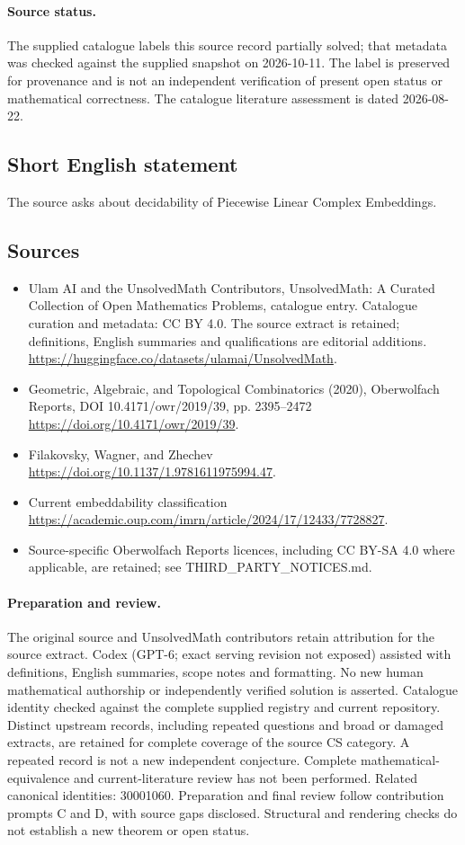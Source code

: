 \documentclass[11pt]{article}
\begin{document}
\paragraph{Source status.}
The supplied catalogue labels this source record partially solved; that metadata was checked against the supplied snapshot on 2026-10-11. The label is preserved for provenance and is not an independent verification of present open status or mathematical correctness. The catalogue literature assessment is dated 2026-08-22.
\subsection{Short English statement}
The source asks about decidability of Piecewise Linear Complex Embeddings.
\subsection{Sources}
\begin{itemize}
\item[\hypertarget{source:statement:1}{S1}] Ulam AI and the UnsolvedMath Contributors, UnsolvedMath: A Curated Collection of Open Mathematics Problems, catalogue entry. Catalogue curation and metadata: CC BY 4.0. The source extract is retained; definitions, English summaries and qualifications are editorial additions.
\url{https://huggingface.co/datasets/ulamai/UnsolvedMath}.
\item[\hypertarget{source:statement:2}{S2}] Geometric, Algebraic, and Topological Combinatorics (2020), Oberwolfach Reports, DOI 10.4171/owr/2019/39, pp. 2395--2472
\url{https://doi.org/10.4171/owr/2019/39}.
\item[\hypertarget{source:statement:3}{S3}] Filakovsky, Wagner, and Zhechev
\url{https://doi.org/10.1137/1.9781611975994.47}.
\item[\hypertarget{source:statement:4}{S4}] Current embeddability classification
\url{https://academic.oup.com/imrn/article/2024/17/12433/7728827}.
\item Source-specific Oberwolfach Reports licences, including CC BY-SA 4.0 where applicable, are retained; see THIRD\_PARTY\_NOTICES.md.
\end{itemize}
\paragraph{Preparation and review.}
The original source and UnsolvedMath contributors retain attribution for the source extract. Codex (GPT-6; exact serving revision not exposed) assisted with definitions, English summaries, scope notes and formatting. No new human mathematical authorship or independently verified solution is asserted. Catalogue identity checked against the complete supplied registry and current repository. Distinct upstream records, including repeated questions and broad or damaged extracts, are retained for complete coverage of the source CS category. A repeated record is not a new independent conjecture. Complete mathematical-equivalence and current-literature review has not been performed. Related canonical identities: 30001060. Preparation and final review follow contribution prompts C and D, with source gaps disclosed. Structural and rendering checks do not establish a new theorem or open status.
\label{end:statement}
\end{document}
